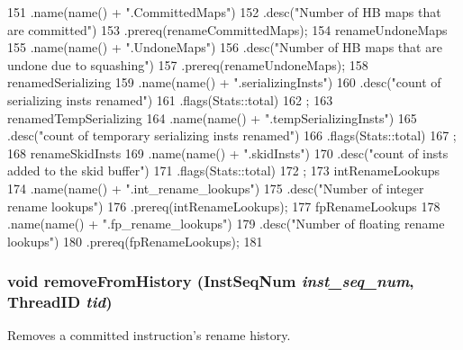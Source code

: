 \begin{DoxyCode}
{151         .name(name() + ".CommittedMaps")
152         .desc("Number of HB maps that are committed")
153         .prereq(renameCommittedMaps);
154     renameUndoneMaps
155         .name(name() + ".UndoneMaps")
156         .desc("Number of HB maps that are undone due to squashing")
157         .prereq(renameUndoneMaps);
158     renamedSerializing
159         .name(name() + ".serializingInsts")
160         .desc("count of serializing insts renamed")
161         .flags(Stats::total)
162         ;
163     renamedTempSerializing
164         .name(name() + ".tempSerializingInsts")
165         .desc("count of temporary serializing insts renamed")
166         .flags(Stats::total)
167         ;
168     renameSkidInsts
169         .name(name() + ".skidInsts")
170         .desc("count of insts added to the skid buffer")
171         .flags(Stats::total)
172         ;
173     intRenameLookups
174         .name(name() + ".int_rename_lookups")
175         .desc("Number of integer rename lookups")
176         .prereq(intRenameLookups);
177     fpRenameLookups
178         .name(name() + ".fp_rename_lookups")
179         .desc("Number of floating rename lookups")
180         .prereq(fpRenameLookups);
181 }
\end{DoxyCode}
\hypertarget{classDefaultRename_a4e15b4f66caef87aacbd195e4a02804d}{
\subsubsection[{removeFromHistory}]{\setlength{\rightskip}{0pt plus 5cm}void removeFromHistory ({\bf InstSeqNum} {\em inst\_\-seq\_\-num}, \/  {\bf ThreadID} {\em tid})}}
\label{classDefaultRename_a4e15b4f66caef87aacbd195e4a02804d}
Removes a committed instruction's rename history. 


